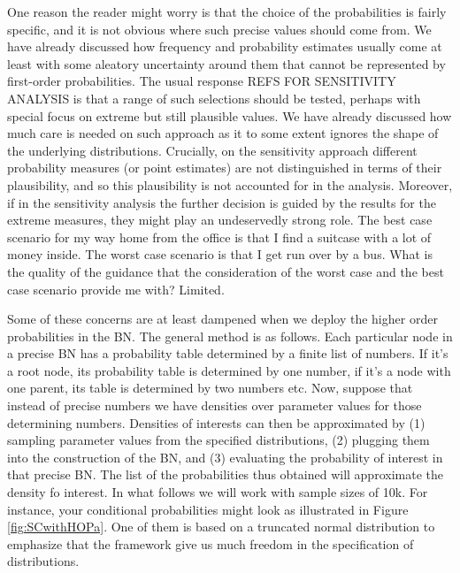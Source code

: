 \documentclass[
  10pt,
  dvipsnames,enabledeprecatedfontcommands]{scrartcl}
\begin{document}
One reason the reader might worry is that the choice of the
probabilities is fairly specific, and it is not obvious where such
precise values should come from. We have already discussed how frequency
and probability estimates usually come at least with some aleatory
uncertainty around them that cannot be represented by first-order
probabilities. The usual response REFS FOR SENSITIVITY ANALYSIS is that
a range of such selections should be tested, perhaps with special focus
on extreme but still plausible values. We have already discussed how
much care is needed on such approach as it to some extent ignores the
shape of the underlying distributions. Crucially, on the sensitivity
approach different probability measures (or point estimates) are not
distinguished in terms of their plausibility, and so this plausibility
is not accounted for in the analysis. Moreover, if in the sensitivity
analysis the further decision is guided by the results for the extreme
measures, they might play an undeservedly strong role. The best case
scenario for my way home from the office is that I find a suitcase with
a lot of money inside. The worst case scenario is that I get run over by
a bus. What is the quality of the guidance that the consideration of the
worst case and the best case scenario provide me with? Limited.

Some of these concerns are at least dampened when we deploy the higher
order probabilities in the BN. The general method is as follows. Each
particular node in a precise BN has a probability table determined by a
finite list of numbers. If it's a root node, its probability table is
determined by one number, if it's a node with one parent, its table is
determined by two numbers etc. Now, suppose that instead of precise
numbers we have densities over parameter values for those determining
numbers. Densities of interests can then be approximated by (1) sampling
parameter values from the specified distributions, (2) plugging them
into the construction of the BN, and (3) evaluating the probability of
interest in that precise BN. The list of the probabilities thus obtained
will approximate the density fo interest. In what follows we will work
with sample sizes of 10k. For instance, your conditional probabilities
might look as illustrated in Figure \ref{fig:SCwithHOPa}. One of them is
based on a truncated normal distribution to emphasize that the framework
give us much freedom in the specification of distributions.
\end{document}
